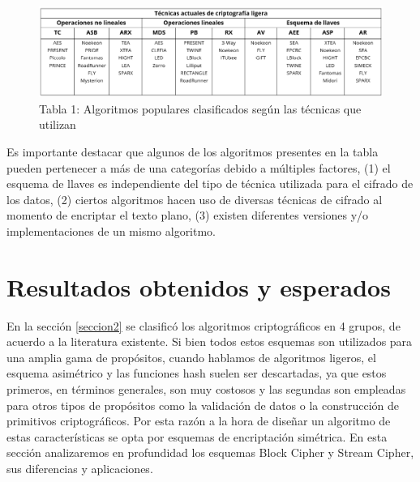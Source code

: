 \documentclass[a4paper,10pt]{article}
\begin{document}
	\begin{figure}[h]
		\centering
		\includegraphics[width=1.0\textwidth]{tablaAlgoritmosCriptografiaLigera.PNG}
		\caption{Tabla 1: Algoritmos populares clasificados según las técnicas que utilizan}
		\label{algoritmosCriptografiaLigera}
	\end{figure}
	Es importante destacar que algunos de los algoritmos presentes en la tabla pueden pertenecer a más de una categorías debido a múltiples factores, (1) el esquema de llaves es independiente del tipo de técnica utilizada para el cifrado de los datos, (2) ciertos algoritmos hacen uso de diversas técnicas de cifrado al momento de encriptar el texto plano, (3) existen diferentes versiones y/o implementaciones de un mismo algoritmo.
	\section{Resultados obtenidos y esperados}
	\label{seccion3}
	En la sección \ref{seccion2} se clasificó los algoritmos criptográficos en 4 grupos, de acuerdo a la literatura existente. Si bien todos estos esquemas son utilizados para una amplia gama de propósitos, cuando hablamos de algoritmos ligeros, el esquema asimétrico y las funciones hash suelen ser descartadas, ya que estos primeros, en términos generales, son muy costosos y las segundas son empleadas para otros tipos de propósitos como la validación de datos o la construcción de primitivos criptográficos. Por esta razón a la hora de diseñar un algoritmo de estas características se opta por esquemas de encriptación simétrica. En esta sección analizaremos en profundidad los esquemas Block Cipher y Stream Cipher, sus diferencias y aplicaciones.
\end{document}

